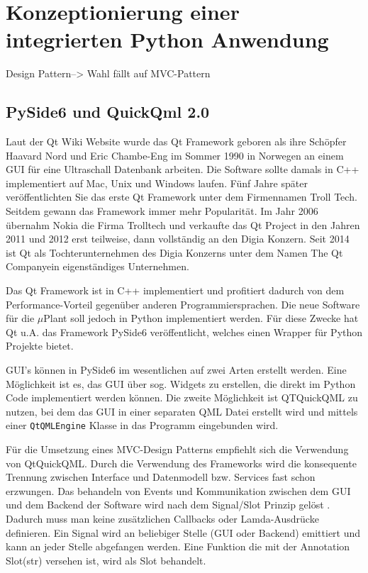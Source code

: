 

\chapter{Konzeptionierung einer integrierten Python Anwendung}\label{PythonApp}

Design Pattern--> Wahl fällt auf MVC-Pattern

\section{PySide6 und QuickQml 2.0}

Laut der Qt Wiki Website \cite{QtWikiHistory} wurde das Qt Framework geboren als ihre Schöpfer Haavard Nord und
Eric Chambe-Eng im Sommer 1990 in Norwegen an einem GUI für eine Ultraschall Datenbank arbeiten.
Die Software sollte damals in C++ implementiert auf Mac, Unix und Windows laufen.
Fünf Jahre später veröffentlichten Sie das erste Qt Framework unter dem Firmennamen Troll Tech.
Seitdem gewann das Framework immer mehr Popularität.
Im Jahr 2006 übernahm Nokia die Firma Trolltech und verkaufte das Qt Project in den Jahren 2011 und 2012 erst teilweise,
dann vollständig an den Digia Konzern.
Seit 2014 ist Qt als Tochterunternehmen des Digia Konzerns unter dem Namen \glqq The Qt Company\grqq ein eigenständiges Unternehmen.

Das Qt Framework ist in C++ implementiert und profitiert dadurch von dem Performance-Vorteil gegenüber anderen
Programmiersprachen.
Die neue Software für die $\mu$Plant soll jedoch in Python implementiert werden.
Für diese Zwecke hat Qt u.A. das Framework PySide6 veröffentlicht, welches einen Wrapper für Python Projekte bietet.

GUI's können in PySide6 im wesentlichen auf zwei Arten erstellt werden.
Eine Möglichkeit ist es, das GUI über sog. Widgets zu erstellen, die direkt im Python Code implementiert werden können.
Die zweite Möglichkeit ist QTQuickQML zu nutzen, bei dem das GUI in einer separaten QML Datei erstellt wird und
mittels einer \verb|QtQMLEngine| Klasse in das Programm eingebunden wird.

Für die Umsetzung eines MVC-Design Patterns empfiehlt sich die Verwendung von QtQuickQML.
Durch die Verwendung des Frameworks wird die konsequente Trennung zwischen Interface und Datenmodell bzw. Services fast
schon erzwungen.
Das behandeln von Events und Kommunikation zwischen dem GUI und dem Backend der Software wird nach dem Signal/Slot Prinzip
gelöst \cite{pysideSignalSlot}.
Dadurch muss man keine zusätzlichen Callbacks oder Lamda-Ausdrücke definieren.
Ein Signal wird an beliebiger Stelle (GUI oder Backend) emittiert und kann an jeder Stelle abgefangen werden.
Eine Funktion die mit der Annotation \glqq Slot(str) \grqq versehen ist, wird als Slot behandelt.
